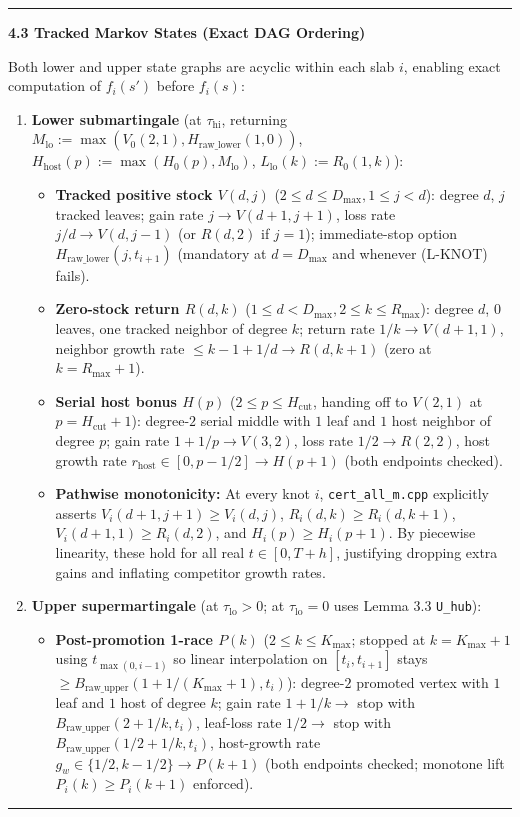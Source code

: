 \documentclass[11pt]{article}
\theoremstyle{remark}
\numberwithin{equation}{section}
\newcommand{\trhead}[1]{\par\smallskip\noindent\textbf{#1}\par\nopagebreak\smallskip}
\newenvironment{transcription}{\par\medskip\noindent\rule{\linewidth}{0.4pt}\par\nopagebreak}{\par\nopagebreak\noindent\rule{\linewidth}{0.4pt}\par\medskip}
\begin{document}
\begin{transcription}
\trhead{4.3 Tracked Markov States (Exact DAG Ordering)}
Both lower and upper state graphs are acyclic within each slab $i$, enabling exact computation of $f_i(s')$ before $f_i(s)$:
\begin{enumerate}
\item \textbf{Lower submartingale} (at $\tau_{\mathrm{hi}}$, returning $M_{\mathrm{lo}} := \max(V_0(2,1), H_{\mathrm{raw\_lower}}(1, 0))$, $H_{\mathrm{host}}(p) := \max(H_0(p), M_{\mathrm{lo}})$, $L_{\mathrm{lo}}(k) := R_0(1, k)$):
\begin{itemize}
\item \textbf{Tracked positive stock $V(d, j)$} ($2 \le d \le D_{\max}, 1 \le j < d$): degree $d$, $j$ tracked leaves; gain rate $j \to V(d+1, j+1)$, loss rate $j/d \to V(d, j-1)$ (or $R(d, 2)$ if $j = 1$); immediate-stop option $H_{\mathrm{raw\_lower}}(j, t_{i+1})$ (mandatory at $d = D_{\max}$ and whenever (L-KNOT) fails).
\item \textbf{Zero-stock return $R(d, k)$} ($1 \le d < D_{\max}, 2 \le k \le R_{\max}$): degree $d$, $0$ leaves, one tracked neighbor of degree $k$; return rate $1/k \to V(d+1, 1)$, neighbor growth rate $\le k - 1 + 1/d \to R(d, k+1)$ (zero at $k = R_{\max}+1$).
\item \textbf{Serial host bonus $H(p)$} ($2 \le p \le H_{\mathrm{cut}}$, handing off to $V(2, 1)$ at $p = H_{\mathrm{cut}}+1$): degree-$2$ serial middle with $1$ leaf and $1$ host neighbor of degree $p$; gain rate $1 + 1/p \to V(3, 2)$, loss rate $1/2 \to R(2, 2)$, host growth rate $r_{\mathrm{host}} \in [0, p - 1/2] \to H(p+1)$ (both endpoints checked).
\item \textbf{Pathwise monotonicity:} At every knot $i$, \texttt{cert\_all\_m.cpp} explicitly asserts $V_i(d+1, j+1) \ge V_i(d, j)$, $R_i(d, k) \ge R_i(d, k+1)$, $V_i(d+1, 1) \ge R_i(d, 2)$, and $H_i(p) \ge H_i(p+1)$. By piecewise linearity, these hold for all real $t \in [0, T+h]$, justifying dropping extra gains and inflating competitor growth rates.
\end{itemize}
\item \textbf{Upper supermartingale} (at $\tau_{\mathrm{lo}} > 0$; at $\tau_{\mathrm{lo}} = 0$ uses Lemma 3.3 \texttt{U\_hub}):
\begin{itemize}
\item \textbf{Post-promotion 1-race $P(k)$} ($2 \le k \le K_{\max}$; stopped at $k = K_{\max}+1$ using $t_{\max(0, i-1)}$ so linear interpolation on $[t_i, t_{i+1}]$ stays $\ge B_{\mathrm{raw\_upper}}(1 + 1/(K_{\max}+1), t_i)$): degree-$2$ promoted vertex with $1$ leaf and $1$ host of degree $k$; gain rate $1 + 1/k \to$ stop with $B_{\mathrm{raw\_upper}}(2 + 1/k, t_i)$, leaf-loss rate $1/2 \to$ stop with $B_{\mathrm{raw\_upper}}(1/2 + 1/k, t_i)$, host-growth rate $g_w \in \{1/2, k - 1/2\} \to P(k+1)$ (both endpoints checked; monotone lift $P_i(k) \ge P_i(k+1)$ enforced).

\end{itemize}
\end{enumerate}
\end{transcription}
\end{document}
